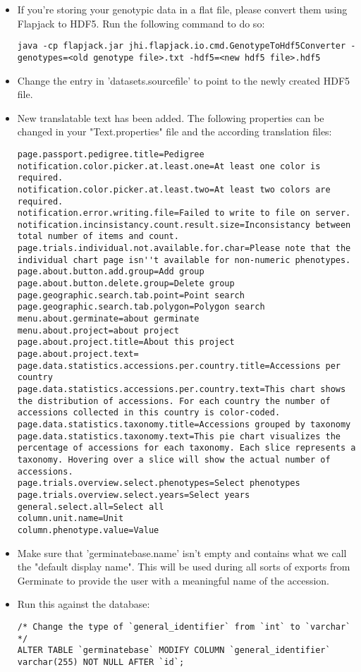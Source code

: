 \begin{itemize}
	\item If you're storing your genotypic data in a flat file, please convert them using Flapjack to HDF5. Run the following command to do so:
	\begin{lstlisting}[style=Bash]
java -cp flapjack.jar jhi.flapjack.io.cmd.GenotypeToHdf5Converter -genotypes=<old genotype file>.txt -hdf5=<new hdf5 file>.hdf5
	\end{lstlisting}
	\item Change the entry in 'datasets.source\textunderscore file' to point to the newly created HDF5 file.
	\item New translatable text has been added. The following properties can be changed in your "Text.properties" file and the according translation files:
	\begin{lstlisting}[style=Properties]
page.passport.pedigree.title=Pedigree
notification.color.picker.at.least.one=At least one color is required.
notification.color.picker.at.least.two=At least two colors are required.
notification.error.writing.file=Failed to write to file on server.
notification.incinsistancy.count.result.size=Inconsistancy between total number of items and count.
page.trials.individual.not.available.for.char=Please note that the individual chart page isn''t available for non-numeric phenotypes.
page.about.button.add.group=Add group
page.about.button.delete.group=Delete group
page.geographic.search.tab.point=Point search
page.geographic.search.tab.polygon=Polygon search
menu.about.germinate=about germinate
menu.about.project=about project
page.about.project.title=About this project
page.about.project.text=
page.data.statistics.accessions.per.country.title=Accessions per country
page.data.statistics.accessions.per.country.text=This chart shows the distribution of accessions. For each country the number of accessions collected in this country is color-coded.
page.data.statistics.taxonomy.title=Accessions grouped by taxonomy
page.data.statistics.taxonomy.text=This pie chart visualizes the percentage of accessions for each taxonomy. Each slice represents a taxonomy. Hovering over a slice will show the actual number of accessions.
page.trials.overview.select.phenotypes=Select phenotypes
page.trials.overview.select.years=Select years
general.select.all=Select all
column.unit.name=Unit
column.phenotype.value=Value
	\end{lstlisting}
	\item Make sure that 'germinatebase.name' isn't empty and contains what we call the "default display name". This will be used during all sorts of exports from Germinate to provide the user with a meaningful name of the accession.
	\item Run this against the database:
	\begin{lstlisting}[style=SQL]
/* Change the type of `general_identifier` from `int` to `varchar` */
ALTER TABLE `germinatebase` MODIFY COLUMN `general_identifier` varchar(255) NOT NULL AFTER `id`;


\end{lstlisting}
\end{itemize}
